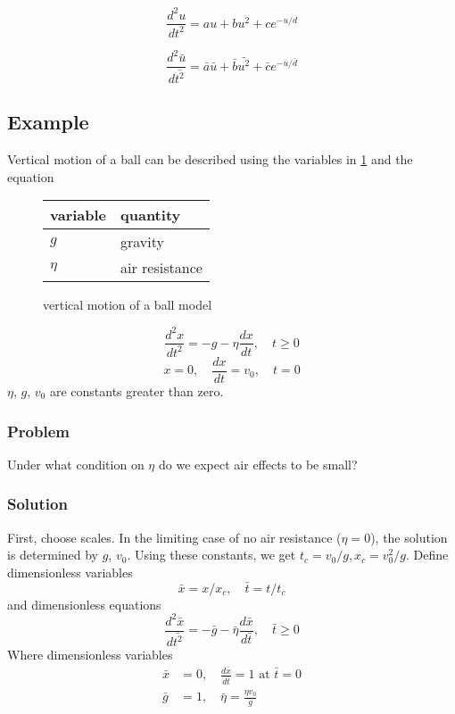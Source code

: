\documentclass[12pt]{article}
\begin{document}
\begin{equation}
  \label{eq:dim-full-eq}
  \frac{d^2u}{dt^2} = au + bu^2 + ce^{-u/d}
\end{equation}

\begin{equation}
  \label{eq:dim-less-eq}
  \frac{d^2\bar{u}}{d\bar{t^2}} = \bar{a} \bar{u} + \bar{b} \bar{u^2} + \bar{c}e^{-\bar{u}/\bar{d}}
\end{equation}

\subsection{Example}
Vertical motion of a ball can be described using the variables in
\cref{fig:ball-model} and the equation

\begin{figure}
  \centering
  \begin{tabularx}{0.5\textwidth}{XX}
    variable & quantity \\ \hline
    $g$ & gravity \\
    $\eta$ & air resistance \\
  \end{tabularx}
  \caption{vertical motion of a ball model}
  \label{fig:ball-model}
\end{figure}

\begin{equation}
  \frac{d^2x}{dt^2} = -g - \eta\frac{dx}{dt}, \quad t\ge0
\end{equation}
\begin{equation}
  x=0,\quad \frac{dx}{dt} = v_0, \quad t=0
\end{equation}
$\eta$, $g$, $v_0$ are constants greater than zero.

\subsubsection*{Problem}
Under what condition on $\eta$ do we expect air effects to be small?

\subsubsection*{Solution}
First, choose scales. In the limiting case of no air resistance ($\eta=0$), the
solution is determined by $g$, $v_0$. Using these constants, we get
$t_c=v_0/g, x_c=v_0^2/g$. Define dimensionless variables
$$\bar{x}=x/x_c,\quad \bar{t}=t/t_c$$ and dimensionless
equations
\begin{equation}
  \frac{d^2\bar{x}}{d\bar{t^2}} = -\bar{g} -
  \bar{\eta}\frac{d\bar{x}}{d\bar{t}}, \quad \bar{t}\ge0
\end{equation}
Where dimensionless variables
\begin{equation}
  \begin{aligned}
    \bar{x} &= 0,\quad \frac{d\bar{x}}{d\bar{t}} = 1 \text{ at } \bar{t} = 0 \\
    \bar{g} &= 1, \quad \bar{\eta} = \frac{\eta v_0}{g} \\
  \end{aligned}
\end{equation}
\end{document}
